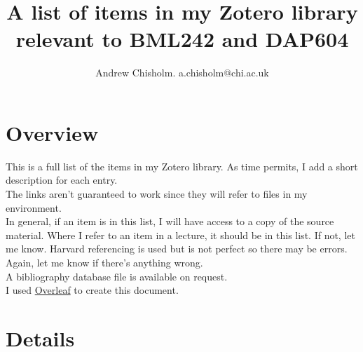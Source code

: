 \documentclass[a4paper]{article}
\title{A list of items in my Zotero library relevant to BML242 and DAP604}
\author{Andrew Chisholm. a.chisholm@chi.ac.uk}
\date{}
\begin{document}
\maketitle

\section*{Overview}

This is a full list of the items in my Zotero library. As time permits, I add a short description for each entry.
\\

The links aren't guaranteed to work since they will refer to files in my environment.
\\

In general, if an item is in this list, I will have access to a copy of the source material. Where I refer to an item in a lecture, it should be in this list. If not, let me know. Harvard referencing is used but is not perfect so there may be errors. Again, let me know if there's anything wrong. 
\\

A bibliography database file is available on request.
\\

I used \href{http://www.overleaf.com}{Overleaf} to create this document. 

\section*{Details}
\end{document}
